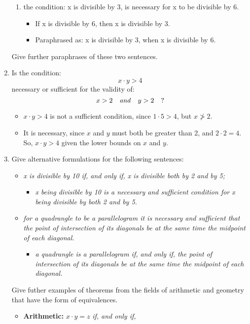 \begin{enumerate}
\begin{enumerate}
  \item the condition: x is divisible by 3, is necessary for x to be
    divisible by 6.
    \begin{itemize}
    \item If x is divisible by 6, then x is divisible by 3.
    \item Paraphrased as: x is divisible by 3, when x is divisible by 6.
    \end{itemize}
  \end{enumerate}
  Give further paraphrases of these two sentences.
\item Is the condition: $$x{\cdot}y > 4$$ necessary or sufficient for
  the validity of: $$x > 2 \quad \text{\emph{and}} \quad y > 2 \quad
  \text{?}$$
  \begin{itemize}
  \item $x{\cdot}y > 4$ is not a sufficient condition, since $1{\cdot}5 >
    4$, but $x \ngtr 2$.
  \item It is necessary, since $x$ and $y$ must both be greater than 2,
    and $2{\cdot}2=4$.  So, $x{\cdot}y > 4$ given the lower bounds on
    $x$ and $y$.
  \end{itemize}
\item Give alternative formulations for the following sentences:
  \begin{itemize}
  \item \emph{x is divisible by 10 if, and only if, x is divisible
      both by 2 and by 5;}
    \begin{itemize}
    \item \emph{x being divisible by 10 is a necessary and sufficient
        condition for x being divisible by both 2 and by 5.}
    \end{itemize}
  \item \emph{for a quadrangle to be a parallelogram it is necessary
      and sufficient that the point of intersection of its diagonals
      be at the same time the midpoint of each diagonal.}
    \begin{itemize}
    \item \emph{a quadrangle is a parallelogram if, and only if, the
        point of intersection of its diagonals be at the same time the
        midpoint of each diagonal.}
    \end{itemize}
  \end{itemize}
  Give futher examples of theorems from the fields of arithmetic and
  geometry that have the form of equivalences.
  \begin{itemize}
  \item \textbf{Arithmetic:} $x{\cdot}y=z$ \emph{if, and only if,}

\end{itemize}
\end{enumerate}
